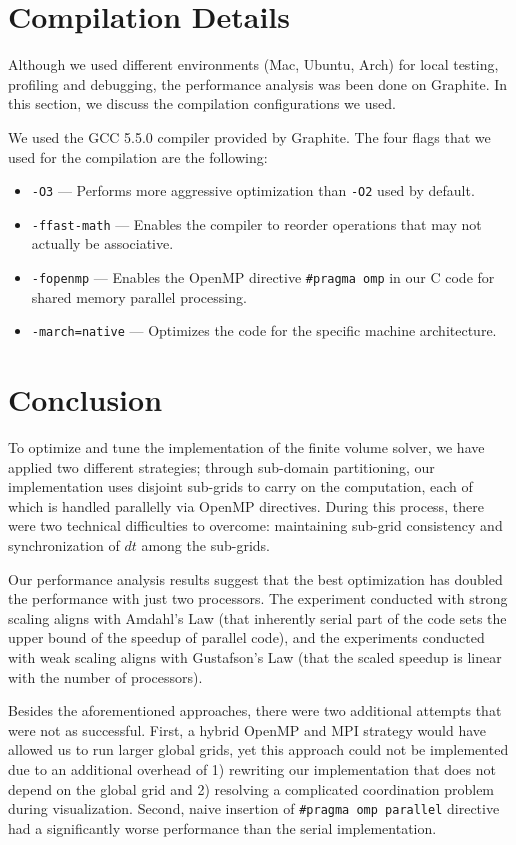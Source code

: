 \documentclass{article}
\begin{document}
\section{Compilation Details}

Although we used different environments (Mac, Ubuntu, Arch) for local testing, profiling and debugging, 
the performance analysis was been done on Graphite. In this section, we discuss the compilation configurations we used.

We used the GCC 5.5.0 compiler provided by Graphite. The four flags that we used for the compilation are the following:
\begin{itemize}
	\item \texttt{-O3} --- Performs more aggressive optimization than \texttt{-O2} used by default.
	\item \texttt{-ffast-math} --- Enables the compiler to reorder operations that may not actually be associative.
	\item \texttt{-fopenmp} --- Enables the OpenMP directive \texttt{\#pragma omp} in our C code for shared memory parallel processing.
	\item \texttt{-march=native} --- Optimizes the code for the specific machine architecture.
\end{itemize}

\section{Conclusion}

To optimize and tune the implementation of the finite volume solver, we have applied two different strategies; through sub-domain partitioning, our implementation uses disjoint sub-grids to carry on the computation, each of which is handled parallelly via OpenMP directives. During this process, there were two technical difficulties to overcome: maintaining sub-grid consistency and synchronization of $dt$ among the sub-grids.

Our performance analysis results suggest that the best optimization has doubled the performance with just two processors. The experiment conducted with strong scaling aligns with Amdahl's Law (that inherently serial part of the code sets the upper bound of the speedup of parallel code), and the experiments conducted with weak scaling aligns with Gustafson's Law (that the scaled speedup is linear with the number of processors).

Besides the aforementioned approaches, there were two additional attempts that were not as successful. First, a hybrid OpenMP and MPI strategy would have allowed us to run larger global grids, yet this approach could not be implemented due to an additional overhead of 1) rewriting our implementation that does not depend on the global grid and 2) resolving a complicated coordination problem during visualization. Second, naive insertion of \texttt{\#pragma omp parallel} directive had a significantly worse performance than the serial implementation.
\end{document}

